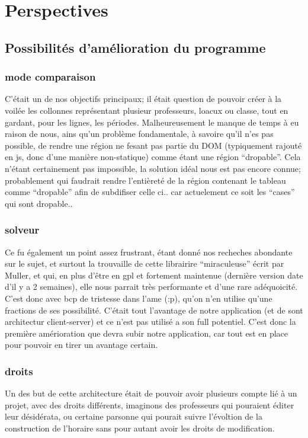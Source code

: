 \chapter{Perspectives}

\section{Possibilités d'amélioration du programme}

\subsection{mode comparaison}
C'était un de nos objectifs principaux; il était question de pouvoir créer à la
voilée les collonnes représentant plusieur professeurs, loacux ou classe, tout
en gardant, pour les lignes, les périodes. Malheureusement le manque de temps à
eu raison de nous, ains qu'un problème fondamentale, à savoire qu'il n'es pas
possible, de rendre une région ne fesant pas partie du DOM (typiquement rajouté
en js, donc d'une manière non-statique) comme étant une région ``dropable''.
Cela n'étant certainement pas impossible, la solution idéal nous est pas encore
connue; probablement qui faudrait rendre l'entièreté de la région contenant le
tableau comme ``dropable'' afin de subdifiser celle ci.. car actuelement ce soit
les ``cases'' qui sont dropable..
\subsection{solveur}
Ce fu également un point assez frustrant, étant donné nos recheches abondante
sur le sujet, et surtout la trouvaille de cette librairire ``miraculeuse'' écrit
par Muller, et qui, en plus d'être en gpl et fortement maintenue (dernière
version date d'il y a 2 semaines), elle nous parrait très performante et d'une
rare adéquoicité.  C'est donc avec bcp de tristesse dans l'ame (:p), qu'on n'en
utilise qu'une fractions de ses possibilité.  C'était tout l'avantage de notre
application (et de sont architectur client-server) et ce n'est pas utilisé a son
full potentiel.  C'est donc la première amérioration que devra subir notre
application, car tout est en place pour pouvoir en tirer un avantage certain.
\subsection{droits}
Un des but de cette architecture était de pouvoir avoir plusieurs compte lié à
un projet, avec des droits différents, imaginons des professeurs qui pouraient
éditer leur désidérata, ou certaine parsonne qui pourait suivre l'évoltion de la
construction de l'horaire sans pour autant avoir les droits de modification.
